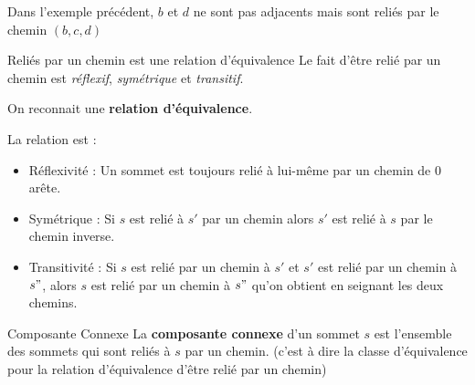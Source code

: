 \begin{Example}{}{}
Dans l'exemple précédent, $b$ et $d$ ne sont pas adjacents mais sont reliés par le chemin $(b,c,d)$
\end{Example}

\begin{Prop}{Reliés par un chemin est une relation d'équivalence}{}
Le fait d'être relié par un chemin est \textit{réflexif}, \textit{symétrique} et \textit{transitif}.

On reconnait une \textbf{relation d'équivalence}.
\end{Prop}

\begin{myproof}
La relation est :
\begin{itemize}
    \item Réflexivité : Un sommet est toujours relié à lui-même par un chemin de 0 arête.
    \item Symétrique : Si $s$ est relié à $s'$ par un chemin alors $s'$ est relié à $s$ par le chemin inverse.
    \item Transitivité : Si $s$ est relié par un chemin à $s'$ et $s'$ est relié par un chemin à $s"$, alors  $s$ est relié par un chemin à $s"$ qu'on obtient en seignant les deux chemins.
\end{itemize}
\end{myproof}

\begin{Definition}[colbacktitle=red!75!black]{Composante Connexe}{}
La \textbf{composante connexe} d'un sommet $s$ est l'ensemble des sommets qui sont reliés à $s$ par un chemin. (c'est à dire la classe d'équivalence pour la relation d'équivalence d'être relié par un chemin)



\end{Definition}


